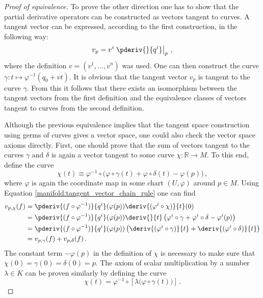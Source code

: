 {\begin{mdframed}[roundcorner=10pt, linecolor=blue, linewidth=1pt]
\begin{proof}[Proof of equivalence]
                To prove the other direction one has to show that the partial derivative operators can be constructed as vectors tangent to curves. A tangent vector can be expressed, according to the first construction, in the following way: \[v_p = v^i\left.\pderiv{}{q^i}\right|_p\,,\] where the definition $v = (v^1,\ldots,v^n)$ was used. One can then construct the curve $\gamma:t\mapsto\varphi^{-1}(q_0+vt)$. It is obvious that the tangent vector $v_p$ is tangent to the curve $\gamma$. From this it follows that there exists an isomorphism between the tangent vectors from the first definition and the equivalence classes of vectors tangent to curves from the second definition.

                Although the previous equivalence implies that the tangent space construction using germs of curves gives a vector space, one could also check the vector space axioms directly. First, one should prove that the sum of vectors tangent to the curves $\gamma$ and $\delta$ is again a vector tangent to some curve $\chi:\mathbb{R}\rightarrow M$. To this end, define the curve \[\chi(t)\equiv\varphi^{-1}\circ\bigl(\varphi\circ\gamma(t) + \varphi\circ\delta(t) - \varphi(p)\bigr)\,,\] where $\varphi$ is again the coordinate map in some chart $(U,\varphi)$ around $p\in M$. Using Equation \eqref{manifold:tangent_vector_chain_rule} one can find
                \begin{align*}
                    v_{p,\chi}(f) &= \pderiv{(f\circ\varphi^{-1})}{q^i}(\varphi(p))\deriv{(\varphi^i\circ\chi)}{t}(0)\\
                    &=\pderiv{(f\circ\varphi^{-1})}{q^i}(\varphi(p))\deriv{}{t}\left(\varphi^i\circ\gamma + \varphi^i\circ\delta - \varphi^i(p)\right)\\
                    &=\pderiv{(f\circ\varphi^{-1})}{q^i}(\varphi(p))\left(\deriv{(\varphi^i\circ\gamma)}{t} + \deriv{(\varphi^i\circ\delta)}{t}\right)\\
                    &=v_{p,\gamma}(f) + v_{p,\delta}(f)\,.
                \end{align*}
                The constant term $-\varphi(p)$ in the definition of $\chi$ is necessary to make sure that $\chi(0) = \gamma(0) = \delta(0) = p$. The axiom of scalar multiplication by a number $\lambda\in K$ can be proven similarly by defining the curve \[\chi(t) = \varphi^{-1}\circ\left[\lambda\bigl(\varphi\circ\gamma(t)\bigr)\right]\,.\]
            \end{proof}
        \end{mdframed}
    }

